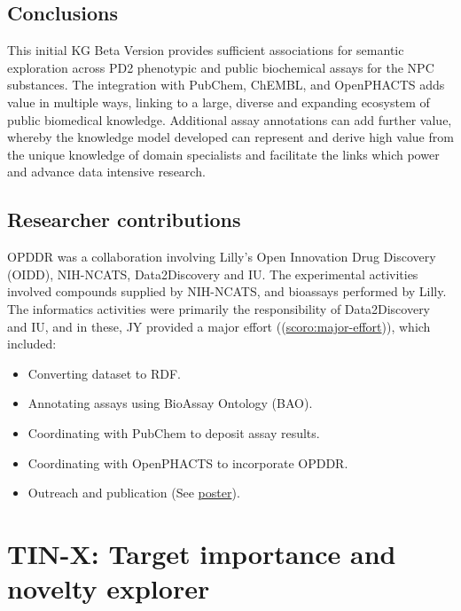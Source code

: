 \subsection{Conclusions}

This initial KG Beta Version provides sufficient associations for semantic exploration across PD2 phenotypic and public biochemical assays for the NPC substances.  The integration with PubChem, ChEMBL, and OpenPHACTS adds value in multiple ways, linking to a large, diverse and expanding ecosystem of public biomedical knowledge.  Additional assay annotations can add further value, whereby the knowledge model developed can represent and derive high value from the unique knowledge of domain specialists and facilitate the links which power and advance data intensive research.

\subsection{Researcher contributions}

OPDDR was a collaboration involving Lilly's Open Innovation Drug Discovery (OIDD), NIH-NCATS, Data2Discovery and IU. The experimental activities involved compounds supplied by NIH-NCATS, and bioassays performed by Lilly. The informatics activities were primarily the responsibility of Data2Discovery and IU, and in these, JY provided a major effort ((\href{http://purl.org/spar/scoro/major-effort}{scoro:major-effort})), which included: 

\begin{itemize}[topsep=0pt,itemsep=0pt,partopsep=0pt,parsep=0pt]
    \item Converting dataset to RDF.
    \item Annotating assays using BioAssay Ontology (BAO).
    \item Coordinating with PubChem to deposit assay results.
    \item Coordinating with OpenPHACTS to incorporate OPDDR.
    \item Outreach and publication (See \href{https://zenodo.org/record/4844529}{poster}).
\end{itemize}

\newpage

\section{TIN-X: Target importance and novelty explorer}
\label{section:tinx}


